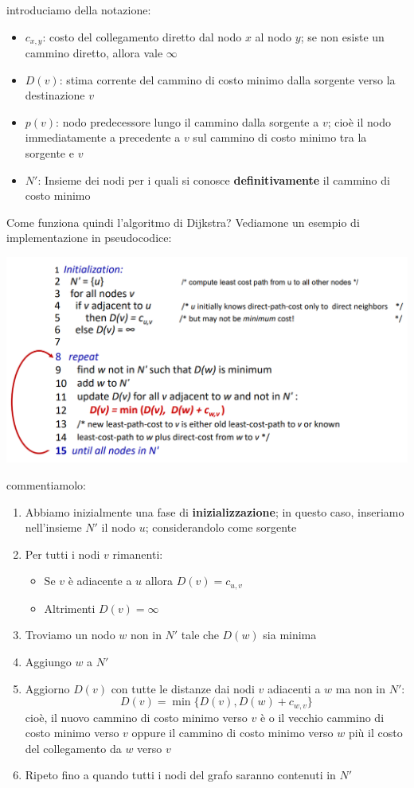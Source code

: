 \documentclass[12pt]{article}
\begin{document}
introduciamo della notazione:
\begin{itemize}
    \item $c_{x,y}$: costo del collegamento diretto dal nodo $x$ al nodo $y$; se non esiste un cammino diretto, allora vale $\infty$
    \item $D(v)$: stima corrente del cammino di costo minimo dalla sorgente verso la destinazione $v$
    \item $p(v)$: nodo predecessore lungo il cammino dalla sorgente a $v$; cioè il nodo immediatamente a precedente a $v$ sul cammino di costo minimo tra la sorgente e $v$
    \item $N'$: Insieme dei nodi per i quali si conosce \textbf{definitivamente} il cammino di costo minimo
\end{itemize}
Come funziona quindi l'algoritmo di Dijkstra? Vediamone un esempio di implementazione in pseudocodice:
\begin{center}
    \includegraphics[width =1\linewidth]{Images/107.png}
\end{center}
commentiamolo:
\begin{enumerate}
    \item Abbiamo inizialmente una fase di \textbf{inizializzazione}; in questo caso, inseriamo nell'insieme $N'$ il nodo $u$; considerandolo come sorgente
    \item Per tutti i nodi $v$ rimanenti:
    \begin{itemize}
        \item Se $v$ è adiacente a $u$ allora $D(v) = c_{u,v}$
        \item Altrimenti $D(v) = \infty$
    \end{itemize}
    \item Troviamo un nodo $w$ non in $N'$ tale che $D(w)$ sia minima
    \item Aggiungo $w$ a $N'$
    \item Aggiorno $D(v)$ con tutte le distanze dai nodi $v$ adiacenti a $w$ ma non in $N'$:
    $$D(v) = \min\{D(v), D(w) + c_{w,v}\}$$
    cioè, il nuovo cammino di costo minimo verso $v$ è o il vecchio cammino di costo minimo verso $v$ oppure il cammino di costo minimo verso $w$ più il costo del collegamento da $w$ verso $v$
    \item Ripeto fino a quando tutti i nodi del grafo saranno contenuti in $N'$
\end{enumerate}
\end{document}
